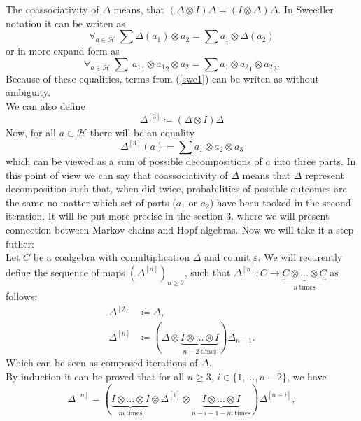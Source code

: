 \documentclass[a4paper, 12pt]{report}
\begin{document}
The coassociativity of $\Delta$ means, that $(\Delta \otimes I)\Delta = (I \otimes \Delta)\Delta$.
In Sweedler notation it can be writen as
\begin{equation*}
\forall_{a \in \mathcal{H}}\ \sum\Delta(a_1) \otimes a_2 = \sum a_1 \otimes \Delta(a_2)
\end{equation*}
or in more expand form as
\begin{equation}\label{swe1}
\forall_{a\in \mathcal{H}}\ \sum\ {a_1}_1 \otimes {a_1}_2 \otimes a_2 = \sum a_1 \otimes {a_2}_1
\otimes {a_2}_2.
\end{equation}
Because of these equalities, terms from (\ref{swe1}) can be writen as
 without ambiguity. \\
We can also define
\begin{equation*}
\Delta^{[3]} \coloneqq (\Delta \otimes I)\Delta
\end{equation*}
Now, for all $a \in \mathcal{H}$ there will be an equality
\begin{equation*}
\Delta^{[3]}(a) = \sum a_1 \otimes a_2 \otimes a_3
\end{equation*}
which can be viewed as a sum of possible decompositions of $a$ into three parts.
In this point of view we can say that coassociativity of $\Delta$ means that $\Delta$ represent
decomposition such that, when did twice, probabilities of possible outcomes are the same
no matter which set of parts ($a_1$ or $a_2$) have been tooked in the second iteration. It will be put more
precise in the section 3. where we will present connection between Markov chains and Hopf algebras.
Now we will take it a step futher: \\[8pt]
\indent Let $C$ be a coalgebra with comultiplication $\Delta$ and counit $\varepsilon$.
We will recurently define the sequence of maps $(\Delta^{[n]})_{n \geq 2}$, such that
$\Delta^{[n]} : C \to \underbrace{C \otimes \dots \otimes C}_{n \mathrm{\ times}}$ as follows:
\begin{align*}
\Delta^{[2]} &\coloneqq \Delta, \\
\Delta^{[n]} &\coloneqq (\Delta \otimes
\underbrace{I \otimes \dots \otimes I}_{n - 2 \mathrm{\ times}})\Delta_{n-1}.
\end{align*}
Which can be seen as composed iterations of $\Delta$. \\
By induction it can be proved that for all $n \geq 3$, $i \in \{1, \dots, n-2\}$,
 we have
\begin{equation*}
\Delta^{[n]} = (\underbrace{I \otimes \dots \otimes I}_{m\ \mathrm{times}} \otimes
\Delta^{[i]} \otimes \underbrace{I \otimes \dots \otimes I}_{n-i-1-m \mathrm{\ times}})\Delta^{[n-i]},
\end{equation*}
\end{document}
